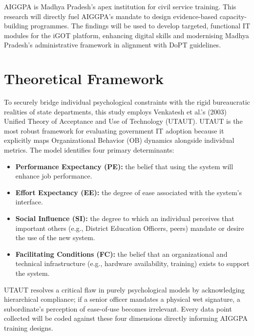 \documentclass[11pt,a4paper]{article}
\begin{document}
AIGGPA is Madhya Pradesh's apex institution for civil service training. This research 
will directly fuel AIGGPA's mandate to design evidence-based capacity-building 
programmes. The findings will be used to develop targeted, functional IT modules 
for the iGOT platform, enhancing digital skills and modernising Madhya Pradesh's 
administrative framework in alignment with DoPT guidelines.

\section{Theoretical Framework}

\vspace{0.2cm}

To securely bridge individual psychological constraints with the rigid bureaucratic 
realities of state departments, this study employs Venkatesh et al.'s (2003) 
Unified Theory of Acceptance and Use of Technology (UTAUT). UTAUT is the most 
robust framework for evaluating government IT adoption because it explicitly maps 
Organizational Behavior (OB) dynamics alongside individual metrics. The model 
identifies four primary determinants:

\begin{itemize}
  \item \textbf{Performance Expectancy (PE):} the belief that using the system 
    will enhance job performance.
  \item \textbf{Effort Expectancy (EE):} the degree of ease associated with 
    the system's interface.
  \item \textbf{Social Influence (SI):} the degree to which an individual 
    perceives that important others (e.g., District Education Officers, peers) 
    mandate or desire the use of the new system.
  \item \textbf{Facilitating Conditions (FC):} the belief that an organizational 
    and technical infrastructure (e.g., hardware availability, training) exists 
    to support the system.
\end{itemize}

UTAUT resolves a critical flaw in purely psychological models by acknowledging 
hierarchical compliance; if a senior officer mandates a physical wet signature, a 
subordinate's perception of ease-of-use becomes irrelevant. Every data point 
collected will be coded against these four dimensions directly informing AIGGPA 
training designs.
\end{document}
